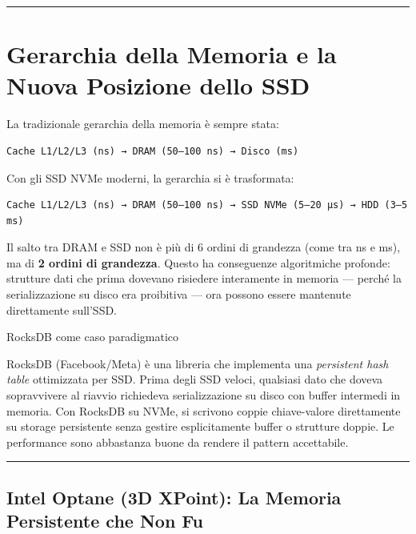 \documentclass[
  italian,
  openany]{book}
\begin{document}
\begin{center}\rule{0.5\linewidth}{0.5pt}\end{center}

\section{Gerarchia della Memoria e la Nuova Posizione dello
SSD}\label{gerarchia-della-memoria-e-la-nuova-posizione-dello-ssd}

La tradizionale gerarchia della memoria è sempre stata:

\begin{verbatim}
Cache L1/L2/L3 (ns) → DRAM (50–100 ns) → Disco (ms)
\end{verbatim}

Con gli SSD NVMe moderni, la gerarchia si è trasformata:

\begin{verbatim}
Cache L1/L2/L3 (ns) → DRAM (50–100 ns) → SSD NVMe (5–20 µs) → HDD (3–5 ms)
\end{verbatim}

Il salto tra DRAM e SSD non è più di 6 ordini di grandezza (come tra ns
e ms), ma di \textbf{2 ordini di grandezza}. Questo ha conseguenze
algoritmiche profonde: strutture dati che prima dovevano risiedere
interamente in memoria --- perché la serializzazione su disco era
proibitiva --- ora possono essere mantenute direttamente sull'SSD.

\begin{callouttip}{RocksDB come caso paradigmatico}

RocksDB (Facebook/Meta) è una libreria che implementa una
\emph{persistent hash table} ottimizzata per SSD. Prima degli SSD
veloci, qualsiasi dato che doveva sopravvivere al riavvio richiedeva
serializzazione su disco con buffer intermedi in memoria. Con RocksDB su
NVMe, si scrivono coppie chiave-valore direttamente su storage
persistente senza gestire esplicitamente buffer o strutture doppie. Le
performance sono abbastanza buone da rendere il pattern accettabile.

\end{callouttip}

\begin{center}\rule{0.5\linewidth}{0.5pt}\end{center}

\subsection{Intel Optane (3D XPoint): La Memoria Persistente che Non
Fu}\label{intel-optane-3d-xpoint-la-memoria-persistente-che-non-fu}
\end{document}
